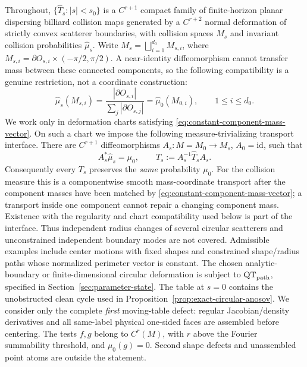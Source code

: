 \documentclass[11pt]{article}
\begin{document}
Throughout, $\{\widehat T_s:|s|<s_0\}$ is a $C^{r+1}$ compact family of
finite-horizon planar dispersing billiard collision maps generated by a
$C^{r+2}$ normal deformation of strictly convex scatterer boundaries, with
collision spaces $M_s$ and invariant collision probabilities
$\widehat\mu_s$.  Write
$M_s=\bigsqcup_{i=1}^{d_0}M_{s,i}$, where
$M_{s,i}=\partial O_{s,i}\times(-\pi/2,\pi/2)$.  A near-identity
diffeomorphism cannot transfer mass between these connected components, so
the following compatibility is a genuine restriction, not a coordinate
construction:
\begin{equation}
\label{eq:constant-component-mass-vector}
 \widehat\mu_s(M_{s,i})
 =\frac{|\partial O_{s,i}|}{\sum_j|\partial O_{s,j}|}
 =\widehat\mu_0(M_{0,i}),\qquad 1\le i\le d_0.
\end{equation}
We work only in deformation charts satisfying
\eqref{eq:constant-component-mass-vector}.  On such a chart we impose the
following measure-trivializing transport interface.  There are $C^{r+1}$ diffeomorphisms
$A_s:M=M_0\to M_s$, $A_0=\mathrm{id}$, such that
\begin{equation}
\label{eq:measure-trivializing-gauge}
 A_s^*\widehat\mu_s=\mu_0,\qquad
 T_s:=A_s^{-1}\widehat T_sA_s .
\end{equation}
Consequently every $T_s$ preserves the \emph{same} probability $\mu_0$.
For the collision measure this is a componentwise smooth mass-coordinate
transport after the component masses have been matched by
\eqref{eq:constant-component-mass-vector}; a transport inside one component
cannot repair a changing component mass.  Existence with the regularity and
chart compatibility used below is part of the interface.  Thus independent
radius changes of several circular scatterers and unconstrained independent
boundary modes are not covered.  Admissible examples include center motions
with fixed shapes and constrained shape/radius paths whose normalized
perimeter vector is constant.  The chosen analytic-boundary or
finite-dimensional circular deformation is subject to
$\mathrm{QT}_{\rm path}$, specified in
Section~\ref{sec:parameter-state}.  The table at $s=0$ contains the
unobstructed clean cycle used in
Proposition~\ref{prop:exact-circular-anosov}.  We consider only the complete
\emph{first} moving-table defect: regular Jacobian/density derivatives and all
same-label physical one-sided faces are assembled before centering.  The tests
$f,g$ belong to $C^r(M)$, with $r$ above the Fourier summability threshold,
and $\mu_0(g)=0$.  Second shape defects and unassembled point atoms are outside
the statement.
\end{document}
